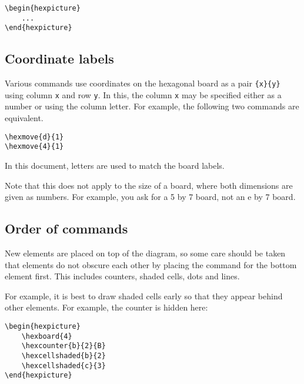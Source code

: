 \documentclass[a4paper,12pt]{article}
\begin{document}
    \begin{verbatim}\begin{hexpicture}
    ...
\end{hexpicture}\end{verbatim}
    
    \subsection{Coordinate labels}
    
    Various commands use coordinates on the hexagonal board as a pair \verb|{x}{y}| using column \verb|x| and row \verb|y|. In this, the column \verb|x| may be specified either as a number or using the column letter. For example, the following two commands are equivalent. 
    
    \begin{verbatim}\hexmove{d}{1}
\hexmove{4}{1}\end{verbatim}
    
    In this document, letters are used to match the board labels.
    
    Note that this does not apply to the size of a board, where both dimensions are given as numbers. For example, you ask for a 5 by 7 board, not an e by 7 board.
    
    \subsection{Order of commands}

    New elements are placed on top of the diagram, so some care should be taken that elements do not obscure each other by placing the command for the bottom element first. This includes counters, shaded cells, dots and lines.
    
    For example, it is best to draw shaded cells early so that they appear behind other elements. For example, the counter is hidden here:

    \begin{verbatim}\begin{hexpicture}
    \hexboard{4}
    \hexcounter{b}{2}{B}
    \hexcellshaded{b}{2}
    \hexcellshaded{c}{3}
\end{hexpicture}\end{verbatim}

    \begin{hexpicture}
    \end{hexpicture}
    
\end{document}
